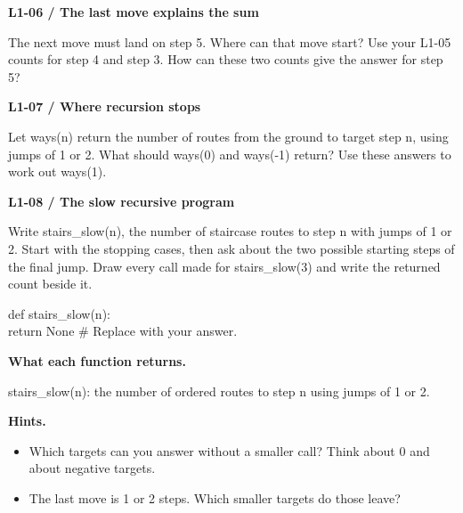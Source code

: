 \documentclass[11pt,a4paper]{article}
\begin{document}
\par\noindent\begin{minipage}{\linewidth}
\textbf{L1-06 / The last move explains the sum}\par\smallskip The next move must land on step 5. Where can that move start? Use your L1-05 counts for step 4 and step 3. How can these two counts give the answer for step 5?\par
\end{minipage}\par\vspace{2mm}
\par\noindent\begin{minipage}{\linewidth}
\textbf{L1-07 / Where recursion stops}\par\smallskip Let ways(n) return the number of routes from the ground to target step n, using jumps of 1 or 2. What should ways(0) and ways(-1) return? Use these answers to work out ways(1).\par
\end{minipage}\par\vspace{2mm}
\par\noindent\begin{minipage}{\linewidth}
\textbf{L1-08 / The slow recursive program}\par\smallskip Write stairs\_slow(n), the number of staircase routes to step n with jumps of 1 or 2. Start with the stopping cases, then ask about the two possible starting steps of the final jump. Draw every call made for stairs\_slow(3) and write the returned count beside it.\par
\par{}\par\smallskip\noindent\colorbox{codepaper}{\parbox{\dimexpr\linewidth-2\fboxsep\relax}{\small\ttfamily\raggedright def stairs\_slow(n):\\\hspace*{2.4em}return None  \# Replace with your answer.}}\par
{\small\textbf{What each function returns.}\par stairs\_slow(n): the number of ordered routes to step n using jumps of 1 or 2.\par }
{\small\textbf{Hints.}}\begin{itemize}\item Which targets can you answer without a smaller call? Think about 0 and about negative targets.\item The last move is 1 or 2 steps. Which smaller targets do those leave?\end{itemize}
\end{minipage}\par\vspace{2mm}
\end{document}
